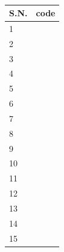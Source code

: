 \begin{table}[htbp]
    \centering
    \caption{}
    \begin{tabular}{ll}
    \hline
    S.N. & code\\
    \hline
    1 & \verb||\\
    2 & \verb||\\
    3 & \verb||\\
    4 & \verb||\\
    5 & \verb||\\
    6 & \verb||\\
    7 & \verb||\\
    8 & \verb||\\
    9 & \verb||\\
    10& \verb||\\
    11 & \verb||\\
    12 & \verb||\\
    13 & \verb||\\
    14 & \verb||\\
    15 & \verb||\\
    \hline
\end{tabular}
\end{table}

